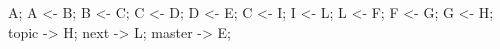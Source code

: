   \rootCommit A;
  \commit A <- B;
  \commit B <- C;
  \commit C <- D;
  \commit D <- E;
  \downCommit C <- I;
  \commit I <- L;
  \downCommit L <- F;
  \commit F <- G;
  \commit G <- H;
  \branchref topic -> H;
  \branchref next -> L;
  \branchref master -> E;
\finefiguranofloattikz
